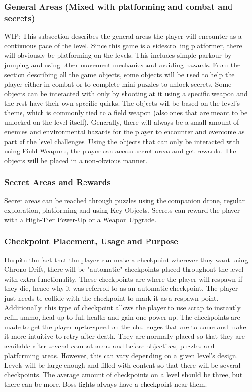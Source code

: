 \documentclass[12pt]{article}
\begin{document}
\subsubsection{General Areas (Mixed with platforming and combat and secrets)}

WIP: This subsection describes the general areas the player will encounter as a continuous pace of the level. Since this game is a sidescrolling platformer, there will obviously be platforming on the levels. This includes simple parkour by jumping and using other movement mechanics and avoiding hazards. From the section describing all the game objects, some objects will be used to help the player either in combat or to complete mini-puzzles to unlock secrets. Some objects can be interacted with only by shooting at it using a specific weapon and the rest have their own specific quirks. The objects will be based on the level's theme, which is commonly tied to a field weapon (also ones that are meant to be unlocked on the level itself). Generally, there will always be a small amount of enemies and environmental hazards for the player to encounter and overcome as part of the level challenges. Using the objects that can only be interacted with using Field Weapons, the player can access secret areas and get rewards. The objects will be placed in a non-obvious manner. 

\subsubsection{Secret Areas and Rewards}

Secret areas can be reached through puzzles using the companion drone, regular exploration, platforming and using Key Objects. Secrets can reward the player with a High-Tier Power-Up or a Weapon Upgrade.

\subsubsection{Checkpoint Placement, Usage and Purpose}

Despite the fact that the player can make a checkpoint wherever they want using Chrono Drift, there will be "automatic" checkpoints placed throughout the level with extra functionality. These checkpoints are where the player will respawn if they die, hence why it was referred to as an automatic checkpoint. The player just needs to collide with the checkpoint to mark it as a respawn-point. Additionally, this type of checkpoint allows the player to use scrap to instantly refill ammo, heal up to full health and gain one power-up. The checkpoints are made to get the player up-to-speed on the challenges that are to come and make it more intuitive to retry after death. They are normally placed so that they are available after several combat areas and before objectives, puzzles and platforming areas. However, this can vary depending on a given level's design. Levels will be large enough and filled with content so that there will be several checkpoints. The average amount of checkpoints on a level should be three, but there can be more. Boss fights always have a checkpoint near them. 
\end{document}
